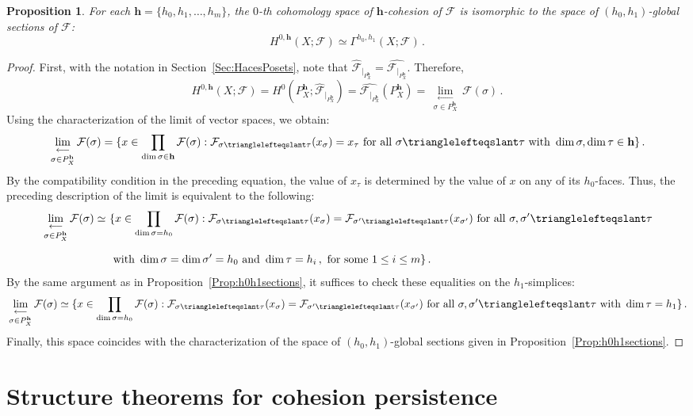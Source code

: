 \documentclass[reqno,12pt]{amsart}
\newcommand{\plim}[1]{\,\underset{#1}{\underset{\longleftarrow}{\lim}}\,}
\newcommand{\face}{{\trianglelefteqslant}}
\newcommand{\cF}{{\mathcal F}}
\newcommand{\0}{\mathbf 0}
\newcommand{\h}{\mathbf{h}}
\newtheorem{proposition}[theorem]{Proposition}
\theoremstyle{definition}
\begin{document}
\begin{proposition}\label{Prop:CohomGlobalSections}
     For each $\h=\{h_0,h_1,\dots, h_m\}$, the $0$-th cohomology space of $\h$-cohesion of $\cF$ is isomorphic to the space of $(h_0,h_1)$-global sections of $\cF$:
    \[
    H^{0,\h}(X;\cF)\simeq \Gamma^{h_0,h_1}(X;\cF)\, .
    \]
\end{proposition}
\begin{proof}
First, with the notation in Section~\ref{Sec:HacesPosets}, note that $\widehat{\cF}_{|_{P_X^\h}}=\widehat{\cF_{|_{P_X^\h}}}$. Therefore,
\[
    H^{0,\h}(X;\cF)=H^0(P_X^\h;\widehat{\cF}_{|_{P_X^\h}})=\widehat{\cF_{|_{P_X^\h}}}(P_X^\h)=\plim{\sigma\in P_X^\h}\cF(\sigma)\, .
\]
Using the characterization of the limit of vector spaces, we obtain:
\[
\plim{\sigma\in P_X^\h}\cF(\sigma)=\{x\in \displaystyle\prod_{\dim\sigma\in \h}\cF(\sigma) : \cF_{\sigma\face\tau}(x_\sigma)=x_\tau \text{ for all } \sigma\face \tau \text{ with } \dim\sigma,\dim\tau\in \h\}\, .
\]
By the compatibility condition in the preceding equation, the value of $x_\tau$ is determined by the value of $x$ on any of its $h_0$-faces. Thus, the preceding description of the limit is equivalent to the following:
\begin{align*}
    \plim{\sigma\in P_X^\h}\cF(\sigma)\simeq \ & \{x\in \displaystyle\prod_{\dim\sigma=h_0}\cF(\sigma) :  \cF_{\sigma\face\tau}(x_\sigma)=\cF_{\sigma'\face \tau}(x_{\sigma'})\text{ for all } \sigma,\sigma'\face\tau \\[1.5ex]  & \text{ with }\dim \sigma=\dim\sigma'=h_0 \text{ and } \dim \tau= h_i\,,\text{ for some } 1\leq i\leq m\}\, .
\end{align*}
By the same argument as in Proposition~\ref{Prop:h0h1sections}, it suffices to check these equalities on the \mbox{$h_1$-simplices}:
\[
\plim{\sigma\in P_X^\h}\cF(\sigma)\simeq \{x\in \displaystyle\prod_{\dim\sigma=h_0}\cF(\sigma) :  \cF_{\sigma\face\tau}(x_\sigma)=\cF_{\sigma'\face \tau}(x_{\sigma'}) \text{ for all } \sigma,\sigma'\face\tau \text{ with } \dim \tau=h_1\}\, .
\]
Finally, this space coincides with the characterization of the space of $(h_0,h_1)$-global sections given in Proposition~\ref{Prop:h0h1sections}.
\end{proof}

\section{Structure theorems for cohesion persistence}\label{ss:cohesivepersistence}
\end{document}
